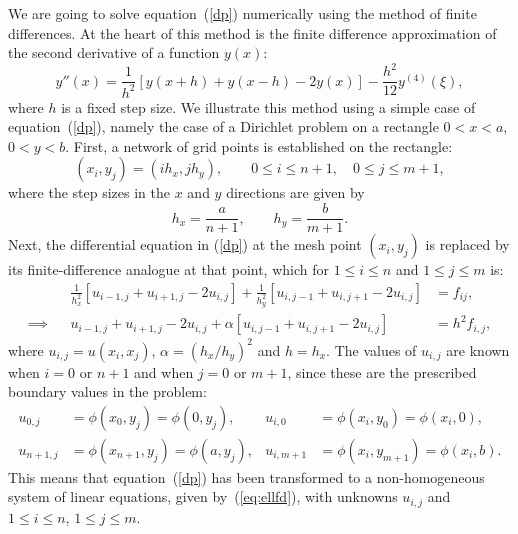 We are going to solve equation~(\ref{dp}) numerically using the method
of finite differences.  At the heart of this method is the finite
difference approximation of the second derivative of a function
$y(x)$:
%
\begin{equation}
  y''(x) = \frac{1}{h^2}[y(x+h)+y(x-h)-2y(x)]-
  \frac{h^2}{12}y^{(4)}(\xi), \label{fd}
\end{equation}
%
where $h$ is a fixed step size.  We illustrate this method using a
simple case of equation~(\ref{dp}), namely the case of a Dirichlet
problem on a rectangle $0<x<a$, $0<y<b$.  First, a network of grid
points is established on the rectangle:
%
\begin{equation*}
  (x_i,y_j)=(i h_x,j h_y), \qquad 0\le i\le n+1, \quad 0\le j\le m+1,
\end{equation*}
%
where the step sizes in the $x$ and $y$ directions are given by
\begin{equation*}
  h_x=\frac{a}{n+1}, \qquad h_y=\frac{b}{m+1}.
\end{equation*}
%
Next, the differential equation in (\ref{dp}) at the mesh point
$(x_i,y_j)$ is replaced by its finite-difference analogue at that
point, which for $1 \le i \le n$ and $1 \le j \le m$ is:
%
\begin{align}
  \label{eq:ellfd}
  & & \frac{1}{h_x^2}[u_{i-1,j}+u_{i+1,j}-2u_{i,j}] +
  \frac{1}{h_y^2}[u_{i,j-1}+u_{i,j+1}-2u_{i,j}] & = f_{i j},
  \nonumber \\
  \implies & & u_{i-1,j}+u_{i+1,j}-2u_{i,j} + \alpha
  [u_{i,j-1}+u_{i,j+1}-2u_{i,j}] & = h^2f_{i,j},
\end{align}
%
where $u_{i,j} = u(x_i,x_j)$, $\alpha=(h_x/h_y)^2$ and $h=h_x$.  The
values of $u_{i,j}$ are known when $i=0$ or $n+1$ and when $j=0$ or
$m+1$, since these are the prescribed boundary values in the problem:
%
\begin{align*}
  u_{0,j} & = \phi(x_0,y_j)  = \phi(0,y_j) , &
  u_{i,0} & = \phi(x_i,y_0)  = \phi(x_i,0), \\
  u_{n+1,j} & = \phi(x_{n+1},y_j)  = \phi(a,y_j), &
  u_{i,m+1} & = \phi(x_i,y_{m+1})  = \phi(x_i,b).
\end{align*}
%
This means that equation~(\ref{dp}) has been transformed to a
non-homogeneous system of linear equations, given by~(\ref{eq:ellfd}),
with unknowns $u_{i,j}$ and $1\le i\le n$, $1\le j\le m$.

